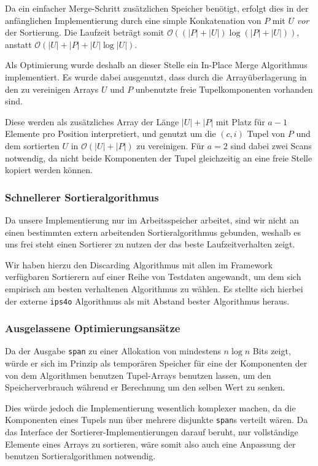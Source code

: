 Da ein einfacher Merge-Schritt zusätzlichen Speicher benötigt, erfolgt dies in der anfänglichen Implementierung durch eine simple Konkatenation von $P$ mit $U$ \textit{vor} der Sortierung. Die Laufzeit beträgt somit $\mathcal{O}( (|P| + |U|) \log (|P| + |U|))$, anstatt $\mathcal{O}( |U| + |P| + |U| \log |U|)$.

Als Optimierung wurde deshalb an dieser Stelle ein In-Place Merge Algorithmus implementiert. Es wurde dabei ausgenutzt, dass durch die Arrayüberlagerung in den zu vereinigen Arrays $U$ und $P$ unbenutzte freie Tupelkomponenten vorhanden sind.

Diese werden als zusätzliches Array der Länge $|U| + |P|$ mit Platz für $a - 1$ Elemente pro Position interpretiert, und genutzt um die $(c, i)$ Tupel von $P$ und dem sortierten $U$ in $\mathcal{O}( |U| + |P|)$ zu vereinigen. Für $a=2$ sind dabei zwei Scans notwendig, da nicht beide Komponenten der Tupel gleichzeitig an eine freie Stelle kopiert werden können.

\subsubsection{Schnellerer Sortieralgorithmus}

Da unsere Implementierung nur im Arbeitsspeicher arbeitet, sind wir nicht an einen bestimmten extern arbeitenden Sortieralgorithmus gebunden, weshalb es uns frei steht einen Sortierer zu nutzen der das beste Laufzeitverhalten zeigt.

Wir haben hierzu den Discarding Algorithmus mit allen im Framework verfügbaren Sortierern auf einer Reihe von Testdaten angewandt, um dem sich empirisch am besten verhaltenen Algorithmus zu wählen. Es stellte sich hierbei der externe \texttt{ips4o}  Algorithmus als mit Abstand bester Algorithmus heraus.


\subsubsection{Ausgelassene Optimierungsansätze}

Da der Ausgabe \texttt{span} zu einer Allokation von mindestens $n \log n$ Bits zeigt, würde er sich im Prinzip als temporären Speicher für eine der Komponenten der von dem Algorithmen benutzen Tupel-Arrays benutzen lassen, um den Speicherverbrauch während er Berechnung um den selben Wert zu senken. 


Dies würde jedoch die Implementierung wesentlich komplexer machen, da die Komponenten eines Tupels nun über mehrere disjunkte \texttt{span}s verteilt wären. Da das Interface der Sortierer-Implementierungen darauf beruht, nur vollständige Elemente eines Arrays zu sortieren, wäre somit also auch eine Anpassung der benutzen Sortieralgorithmen notwendig.

